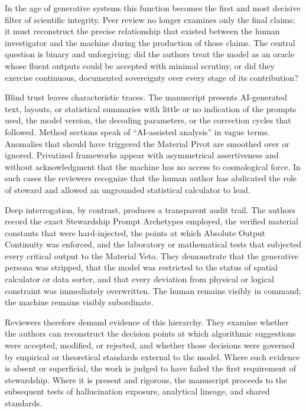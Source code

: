 In the age of generative systems this function becomes the first and most decisive filter of scientific integrity. Peer review no longer examines only the final claims; it must reconstruct the precise relationship that existed between the human investigator and the machine during the production of those claims. The central question is binary and unforgiving: did the authors treat the model as an oracle whose fluent outputs could be accepted with minimal scrutiny, or did they exercise continuous, documented sovereignty over every stage of its contribution?

Blind trust leaves characteristic traces. The manuscript presents AI-generated text, layouts, or statistical summaries with little or no indication of the prompts used, the model version, the decoding parameters, or the correction cycles that followed. Method sections speak of “AI-assisted analysis” in vague terms. Anomalies that should have triggered the Material Pivot are smoothed over or ignored. Privatized frameworks appear with asymmetrical assertiveness and without acknowledgment that the machine has no access to cosmological force. In such cases the reviewers recognize that the human author has abdicated the role of steward and allowed an ungrounded statistical calculator to lead.

Deep interrogation, by contrast, produces a transparent audit trail. The authors record the exact Stewardship Prompt Archetypes employed, the verified material constants that were hard-injected, the points at which Absolute Output Continuity was enforced, and the laboratory or mathematical tests that subjected every critical output to the Material Veto. They demonstrate that the generative persona was stripped, that the model was restricted to the status of spatial calculator or data sorter, and that every deviation from physical or logical constraint was immediately overwritten. The human remains visibly in command; the machine remains visibly subordinate.

Reviewers therefore demand evidence of this hierarchy. They examine whether the authors can reconstruct the decision points at which algorithmic suggestions were accepted, modified, or rejected, and whether those decisions were governed by empirical or theoretical standards external to the model. Where such evidence is absent or superficial, the work is judged to have failed the first requirement of stewardship. Where it is present and rigorous, the manuscript proceeds to the subsequent tests of hallucination exposure, analytical lineage, and shared standards.

